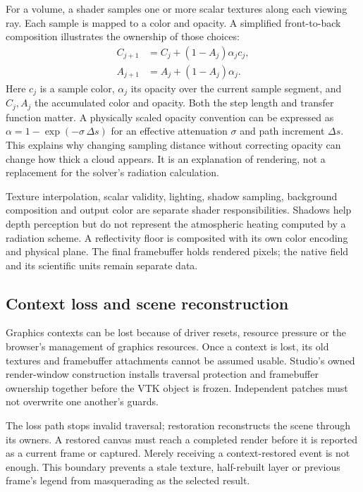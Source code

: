For a volume, a shader samples one or more scalar textures along each viewing
ray. Each sample is mapped to a color and opacity. A simplified front-to-back
composition illustrates the ownership of those choices:
\begin{align}
 C_{j+1} &= C_j+(1-A_j)\alpha_j c_j,\\
 A_{j+1} &= A_j+(1-A_j)\alpha_j.
\end{align}
Here $c_j$ is a sample color, $\alpha_j$ its opacity over the current sample
segment, and $C_j,A_j$ the accumulated color and opacity. Both the step length
and transfer function matter. A physically scaled opacity convention can be
expressed as $\alpha=1-\exp(-\sigma\,\Delta s)$ for an effective attenuation
$\sigma$ and path increment $\Delta s$. This explains why changing sampling
distance without correcting opacity can change how thick a cloud appears.
It is an explanation of rendering, not a replacement for the solver's
radiation calculation.

Texture interpolation, scalar validity, lighting, shadow sampling, background
composition and output color are separate shader responsibilities. Shadows help
depth perception but do not represent the atmospheric heating computed by a
radiation scheme. A reflectivity floor is composited with its own color encoding
and physical plane. The final framebuffer holds rendered pixels; the native
field and its scientific units remain separate data.

\subsection{Context loss and scene reconstruction}
Graphics contexts can be lost because of driver resets, resource pressure or
the browser's management of graphics resources. Once a context is lost, its
old textures and framebuffer attachments cannot be assumed usable. Studio's
owned render-window construction installs traversal protection and framebuffer
ownership together before the VTK object is frozen. Independent patches must
not overwrite one another's guards.

The loss path stops invalid traversal; restoration reconstructs the scene through
its owners. A restored canvas must reach a completed render before it is reported
as a current frame or captured. Merely receiving a context-restored event is not
enough. This boundary prevents a stale texture, half-rebuilt layer or previous
frame's legend from masquerading as the selected result.

